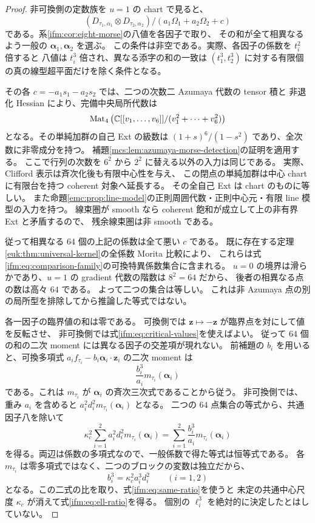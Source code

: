 \begin{proof}
非可換側の定数族を $u=1$ の chart で見ると、
\[
 (D_{\tau_1,\alpha_1}\otimes D_{\tau_2,\alpha_2})/
                  (a_1\Omega_1+a_2\Omega_2+c)
\]
である。系\ref{ifm:cor:eight-morse}の八値を各因子で取り、
その和が全て相異なるよう一般の $\boldsymbol\alpha_1,\boldsymbol\alpha_2$ を選ぶ。
この条件は非空である。実際、各因子の係数を $t_i^2$ 倍すると
八値は $t_i^3$ 倍され、異なる添字の和の一致は
$(t_1^3,t_2^3)$ に対する有限個の真の線型超平面だけを除く条件となる。

その各 $c=-a_1s_1-a_2s_2$ では、二つの次数二 Azumaya 代数の tensor 積と
非退化 Hessian により、完備中央局所代数は
\[
 \operatorname{Mat}_{4}\left(
       \mathbb C[[v_1,\ldots,v_6]]/(v_1^2+\cdots+v_6^2)\right)
\]
となる。その単純加群の自己 Ext の級数は
$(1+s)^6/(1-s^2)$ であり、全次数に非零成分を持つ。
補題\ref{mcs:lem:azumaya-morse-detection}の証明を適用する。
ここで行列の次数を $6^2$ から $2^2$ に替える以外の入力は同じである。
実際、Clifford 表示は斉次化後も有限中心性を与え、
この閉点の単純加群は中心 chart に有限台を持つ coherent 対象へ延長する。
その全自己 Ext は chart のものに等しい。
また命題\ref{emc:prop:line-model}の正則周囲代数・正則中心元・有限 line 模型の入力を持つ。
線束圏が smooth なら coherent 飽和が成立して上の非有界 Ext と矛盾するので、
残余線束圏は非 smooth である。

従って相異なる $64$ 個の上記の係数は全て悪い $c$ である。
既に存在する定理\ref{euk:thm:universal-kernel}の全係数 Morita 比較により、
これらは式\eqref{ifm:eq:comparison-family}の可換特異係数集合に含まれる。
$u=0$ の境界は滑らかであり、$u=1$ の gradient 代数の階数は $8^2=64$ だから、
後者の相異なる点の数は高々 $64$ である。
よって二つの集合は等しい。
これは非 Azumaya 点の別の局所型を排除してから推論した等式ではない。

各一因子の臨界値の和は零である。
可換側では $\mathbf z\mapsto-\mathbf z$ が臨界点を対にして値を反転させ、
非可換側では式\eqref{ifm:eq:critical-values}を使えばよい。
従って $64$ 個の和の二次 moment には異なる因子の交差項が現れない。
前補題の $b_i$ を用いると、可換多項式
$a_if_{\tau_i}-b_i\boldsymbol\alpha_i\cdot\mathbf z_i$ の二次 moment は
\[
                \frac{b_i^3}{a_i}m_{\tau_i}(\boldsymbol\alpha_i)
\]
である。これは $m_{\tau_i}$ が $\boldsymbol\alpha_i$ の斉次三次式であることから従う。
非可換側では、重み $a_i$ を含めると
$a_i^2d_i^2m_{\tau_i}(\boldsymbol\alpha_i)$ となる。
二つの $64$ 点集合の等式から、共通因子八を除いて
\[
 \kappa_c^2\sum_{i=1}^2 a_i^2d_i^2m_{\tau_i}(\boldsymbol\alpha_i)
       =\sum_{i=1}^2\frac{b_i^3}{a_i}m_{\tau_i}(\boldsymbol\alpha_i)
\]
を得る。両辺は係数の多項式なので、一般係数で得た等式は恒等式である。
各 $m_{\tau_i}$ は零多項式ではなく、二つのブロックの変数は独立だから、
\[
                     b_i^3=\kappa_c^2a_i^3d_i^2
                     \qquad(i=1,2)
\]
となる。この二式の比を取り、式\eqref{ifm:eq:same-ratio}を使うと
未定の共通中心尺度 $\kappa_c$ が消えて式\eqref{ifm:eq:ell-ratio}を得る。
個別の $\ell_i^3$ を絶対的に決定したとはしていない。


\end{proof}
